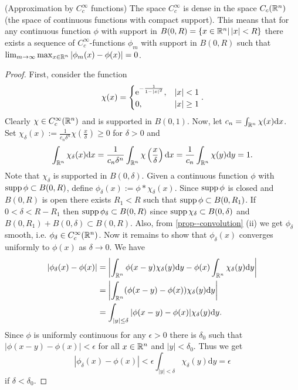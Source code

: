 \documentclass[11pt]{article}
\begin{document}
			\begin{prop}\label{prop--approx}
				(Approximation by $C^\infty_c$ functions) The space $C^\infty_c$ is dense in the space $C_c(\mathbb{R}^n)$ (the space of continuous functions with compact support). This means that for any continuous function $\phi$ with support in $B(0,R)=\{x\in\mathbb{R}^n|\,|x|< R\}$ there exists a sequence of $C^\infty_c$-functions $\phi_m$ with support in $B(0,R)$ such that $\lim_{m\rightarrow\infty}\max_{x\in\mathbb{R}^n}|\phi_m(x)-\phi(x)|=0$.
			\end{prop}
			\begin{proof}
				First, consider the function 
				\begin{equation*}
					\chi(x)=\begin{cases}
						\mathrm{e}^{-\frac{1}{1-|x|^2}}, & |x|<1\\
						0, & |x|\ge1
					\end{cases}.
				\end{equation*}
				Clearly $\chi\in C^\infty_c(\mathbb{R}^n)$ and is supported in $B(0,1)$. Now, let $c_n=\int_{\mathbb{R}^n}\chi(x)\mathrm{d}x$. Set $\chi_\delta(x):=\frac{1}{c_n\delta^n}\chi(\frac{x}{\delta})\ge0$ for $\delta>0$ and
				\begin{equation*}
					\int_{\mathbb{R}^n}\chi_\delta(x)\mathrm{d}x=\frac{1}{c_n\delta^n}\int_{\mathbb{R}^n}\chi\left(\frac{x}{\delta}\right)\mathrm{d}x=\frac{1}{c_n}\int_{\mathbb{R}^n}\chi(y)\mathrm{d}y=1.
				\end{equation*}
				Note that $\chi_\delta$ is supported in $B(0,\delta)$. Given a continuous function $\phi$ with $\operatorname{supp}\phi\subset B(0,R)$, define $\phi_\delta(x):=\phi\ast\chi_\delta(x)$. Since $\operatorname{supp}\phi$ is closed and $B(0,R)$ is open there exists $R_1<R$ such that $\operatorname{supp}\phi\subset B(0,R_1)$. If $0<\delta< R-R_1$ then $\operatorname{supp}\phi_\delta\subset B(0,R)$ since $\operatorname{supp}\chi_\delta\subset B(0,\delta)$ and $B(0,R_1)+B(0,\delta)\subset B(0,R)$. Also, from \autoref{prop--convolution} (ii) we get $\phi_\delta$ smooth, i.e. $\phi_\delta\in C^\infty_c(\mathbb{R}^n)$. Now it remains to show that $\phi_\delta(x)$ converges uniformly to $\phi(x)$ as $\delta\rightarrow0$. We have 
				\begin{align*}
					|\phi_\delta(x)-\phi(x)|&=\left|\int_{\mathbb{R}^n}\phi(x-y)\chi_\delta(y)\mathrm{d}y-\phi(x)\int_{\mathbb{R}^n}\chi_\delta(y)\mathrm{d}y\right|\\
					&=\left|\int_{\mathbb{R}^n}(\phi(x-y)-\phi(x))\chi_\delta(y)\mathrm{d}y\right|\\
					&=\int_{|y|\le\delta}|\phi(x-y)-\phi(x)|\chi_\delta(y)\mathrm{d}y.
				\end{align*}
				Since $\phi$ is uniformly continuous for any $\epsilon>0$ there is $\delta_0$ such that $|\phi(x-y)-\phi(x)|<\epsilon$ for all $x\in\mathbb{R}^n$ and $|y|<\delta_0$. Thus we get
				\begin{equation*}
					|\phi_\delta(x)-\phi(x)|<\epsilon\int_{|y|<\delta}\chi_\delta(y)\mathrm{d}y=\epsilon
				\end{equation*} 
				if $\delta<\delta_0$.
			\end{proof}
\end{document}
